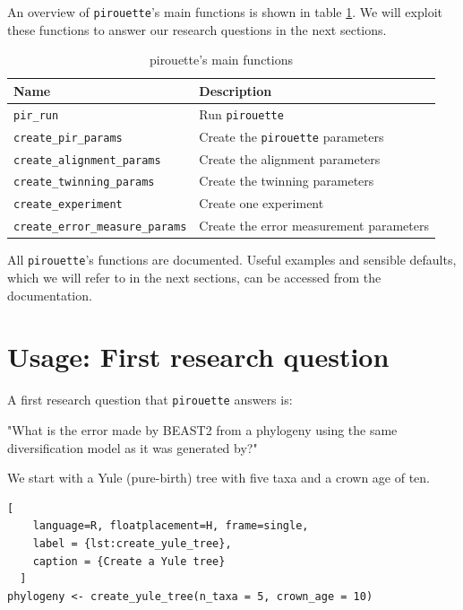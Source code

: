 \documentclass{article}
\begin{document}
An overview of \verb;pirouette;'s main functions is shown in 
table \ref{tab:functions}. We will exploit these functions to answer our research questions in the next sections.

\begin{table}[h]
\centering
\begin{tabular}{ | l | l | }
\hline
\textbf{Name} & \textbf{Description} \\
\hline
\verb;pir_run; & Run \verb;pirouette; \\
\verb;create_pir_params; & Create the \verb;pirouette; parameters \\
\hline
\verb;create_alignment_params; & Create the alignment parameters \\
\verb;create_twinning_params; & Create the twinning parameters \\
\verb;create_experiment; & Create one experiment \\
\verb;create_error_measure_params; & Create the error measurement parameters \\
\hline
\end{tabular}
\caption{pirouette's main functions}
\label{tab:functions}
\end{table}

All \verb;pirouette;'s functions are documented. Useful examples and sensible defaults, which we will refer to in the next sections, can be accessed from the documentation.

\section{Usage: First research question}

A first research question that \verb;pirouette; answers is:

"What is the error made by BEAST2 from a phylogeny using the same diversification model as it was generated by?"

We start with a Yule (pure-birth) tree with five taxa and a crown age of ten.

\begin{lstlisting}[
    language=R, floatplacement=H, frame=single, 
    label = {lst:create_yule_tree}, 
    caption = {Create a Yule tree}
  ]
phylogeny <- create_yule_tree(n_taxa = 5, crown_age = 10)
\end{lstlisting}
\end{document}
